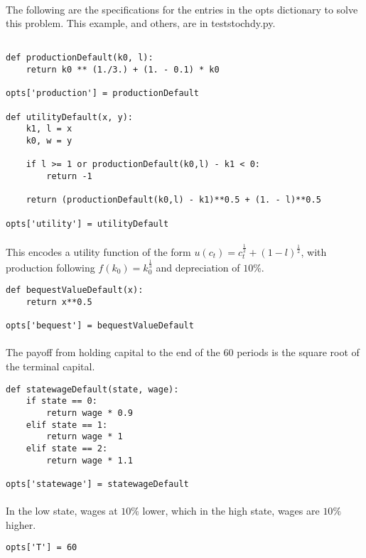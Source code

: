 \documentclass[11pt]{article}
\begin{document}
\paragraph{} The following are the specifications for the entries in the opts dictionary to solve this problem. This example, and others, are in teststochdy.py.

\begin{verbatim}

def productionDefault(k0, l):
    return k0 ** (1./3.) + (1. - 0.1) * k0 
	
opts['production'] = productionDefault

def utilityDefault(x, y):
    k1, l = x
    k0, w = y

    if l >= 1 or productionDefault(k0,l) - k1 < 0:
        return -1

    return (productionDefault(k0,l) - k1)**0.5 + (1. - l)**0.5
	
opts['utility'] = utilityDefault
\end{verbatim}
\paragraph{} This encodes a utility function of the form $u(c_t) = c_t^{\frac{1}{2}} + (1 - l)^{\frac{1}{2}}$, with production following $f(k_0) = k_0^{\frac{1}{3}}$ and depreciation of $10\%$.
\begin{verbatim}
def bequestValueDefault(x):
    return x**0.5
	
opts['bequest'] = bequestValueDefault
\end{verbatim}
\paragraph{} The payoff from holding capital to the end of the 60 periods is the square root of the terminal capital. 
\begin{verbatim}
def statewageDefault(state, wage):
    if state == 0:
        return wage * 0.9
    elif state == 1:
        return wage * 1
    elif state == 2:
        return wage * 1.1

opts['statewage'] = statewageDefault
\end{verbatim}
\paragraph{} In the low state, wages at $10\%$ lower, which in the high state, wages are $10\%$ higher.
\begin{verbatim}
opts['T'] = 60
\end{verbatim}
\end{document}
